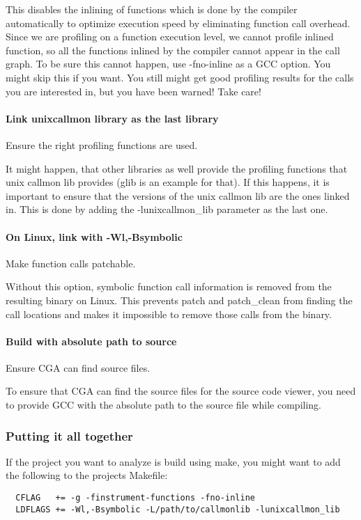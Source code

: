 This disables the inlining of functions which is done by the compiler automatically to optimize execution speed by eliminating function call overhead. Since we are profiling on a function execution level, we cannot profile inlined function, so all the functions inlined by the compiler cannot appear in the call graph. To be sure this cannot happen, use -fno-inline as a GCC option. You might skip this if you want. You still might get good profiling results for the calls you are interested in, but you have been warned! Take care!

\paragraph{Link unixcallmon library as the last library} Ensure the right profiling functions are used.

It might happen, that other libraries as well provide the profiling functions that unix callmon lib provides (glib is an example for that). If this happens, it is important to ensure that the versions of the unix callmon lib are the ones linked in. This is done by adding the -lunixcallmon\_lib parameter as the last one.

\paragraph{On Linux, link with -Wl,-Bsymbolic} Make function calls patchable.

Without this option, symbolic function call information is removed from the resulting binary on Linux. This prevents patch and patch\_clean from finding the call locations and makes it impossible to remove those calls from the binary. 

\paragraph{Build with absolute path to source} Ensure CGA can find source files.

To ensure that CGA can find the source files for the source code viewer, you need to provide GCC with the absolute path to the source file while compiling.

\subsubsection{Putting it all together} If the project you want to analyze is build using make, you might want to add the following to the projects Makefile:
\begin{verbatim}
  CFLAG   += -g -finstrument-functions -fno-inline 
  LDFLAGS += -Wl,-Bsymbolic -L/path/to/callmonlib -lunixcallmon_lib
\end{verbatim}

